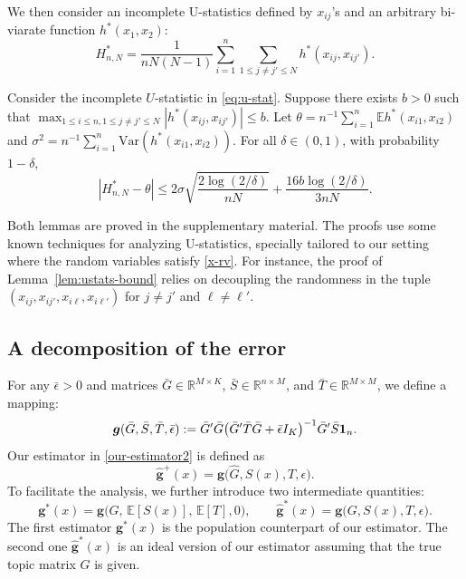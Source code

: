 \documentclass[preprint,11pt]{article}
\newcommand{\mbb}{\mathbb}
\newcommand{\Var}{\text{Var}}
\numberwithin{equation}{section}
\newcommand{\beq}{\begin{equation}}
\newcommand{\eeq}{\end{equation}}
\begin{document}
We then consider an incomplete U-statistics defined by $x_{ij}$'s and an arbitrary bi-viarate function $h^*(x_1, x_2)$:
\beq \label{eq:u-stat}
    H^*_{n,N}=\frac{1}{nN(N-1)}\sum_{i=1}^n\sum_{1\le j\neq j'\le N}h^*(x_{ij},x_{ij'}). 
\eeq
\begin{lemma}\label{lem:ustats-bound}
Consider the incomplete $U$-statistic in \eqref{eq:u-stat}. Suppose there exists $b>0$ such that $\max_{1\leq i\leq n, 1\leq j\neq j'\leq N}|h^*(x_{ij},x_{ij'})|\le b$. 
Let  $\theta=n^{-1}\sum_{i=1}^{n} \mbb{E}h^*(x_{i1},x_{i2})$ and $\sigma^2=n^{-1}\sum_{i=1}^{n}\Var(h^*(x_{i1},x_{i2}))$. For all $\delta\in (0,1)$, with probability $1-\delta$,
    \[
        |H^*_{n,N}-\theta|\le 2\sigma\sqrt{\frac{2\log(2/\delta)}{nN}}+\frac{16b\log(2/\delta)}{3nN}. 
    \] 
\end{lemma}

Both lemmas are proved in the supplementary material. The proofs use some known techniques for analyzing U-statistics, specially tailored to our setting where the random variables satisfy \eqref{x-rv}. For instance, the proof of Lemma~\ref{lem:ustats-bound} relies on decoupling the randomness in the tuple $(x_{ij},x_{ij'},x_{i\ell},x_{i\ell'})$ for $j\neq j'$ and $\ell\neq \ell'$. 


\subsection{A decomposition of the error} \label{subsec:UBproof-decompose}
For any $\bar{\epsilon}>0$ and matrices $\bar{G}\in\mathbb{R}^{M\times K}$, $\bar{S}\in\mathbb{R}^{n\times M}$, and $\bar{T}\in\mathbb{R}^{M\times M}$, we define a mapping:
\beq \label{g(GST)}
{\boldsymbol g}(\bar{G}, \bar{S}, \bar{T}, \bar{\epsilon}) := \bar{G}'\bar{G} \bigl(\bar{G}'\bar{T}\bar{G} + \bar{\epsilon}I_K\bigr)^{-1}\bar{G}'\bar{S}{\bf 1}_n. 
\eeq
Our estimator in \eqref{our-estimator2} is defined as
\[
\widehat{\boldsymbol g}^+(x)  = {\boldsymbol g}\bigl(\widehat{G}, S(x), T, \epsilon \bigr).
\] 
To facilitate the analysis, we further introduce two intermediate quantities: 
\beq \label{all-estimators}
{\boldsymbol g}^*(x) = {\boldsymbol g}\bigl(G,\, \mathbb{E}[S(x)],\, \mathbb{E}[T], 0\bigr),\qquad \widehat{\boldsymbol g}^*(x) = {\boldsymbol g}\bigl(G, S(x), T, \epsilon \bigr). 
\eeq
The first estimator ${\boldsymbol g}^*(x)$ is the population counterpart of our estimator. The second one $\widehat{\boldsymbol g}^*(x)$ is an ideal version of our estimator assuming that the true topic matrix $G$ is given. 
\end{document}
